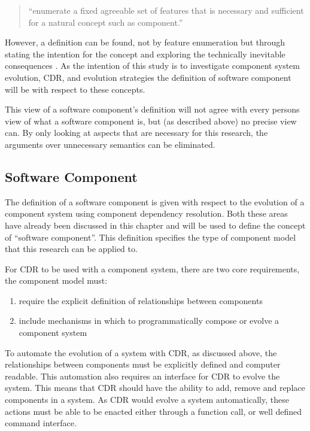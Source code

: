 \begin{quotation} 
``enumerate a fixed agreeable set of features that is necessary and sufficient for a natural concept such as component.'' 
\end{quotation}

However, a definition can be found, not by feature enumeration but through stating the intention for the concept and exploring the technically inevitable consequences \citep{Szyperski2002}. 
As the intention of this study is to investigate component system evolution, CDR, and evolution strategies
the definition of software component will be with respect to these concepts.

This view of a software component's definition will not agree with every persons view of what a software component is, but (as described above) no precise view can.
By only looking at aspects that are necessary for this research, the arguments over unnecessary semantics can be eliminated. 

\subsection{Software Component}
The definition of a software component is given with respect to the evolution of a component system using component dependency resolution.
Both these areas have already been discussed in this chapter and will be used to define the concept of ``software component''.
This definition specifies the type of component model that this research can be applied to.

For CDR to be used with a component system, there are two core requirements, the component model must:
\begin{enumerate}
  \item require the explicit definition of relationships between components
  \item include mechanisms in which to programmatically compose or evolve a component system
\end{enumerate}
To automate the evolution of a system with CDR, as discussed above, the relationships between components must be explicitly defined and computer readable.
This automation also requires an interface for CDR to evolve the system.
This means that CDR should have the ability to add, remove and replace components in a system.
As CDR would evolve a system automatically, these actions must be able to be enacted either through a function call, or well defined command interface.

